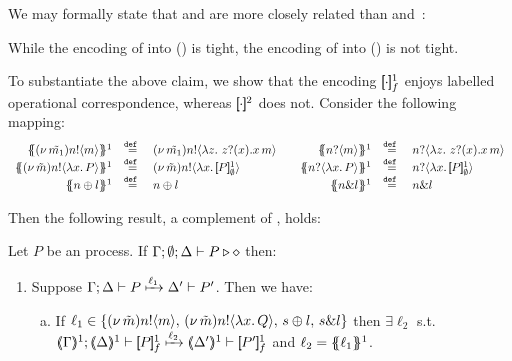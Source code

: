 \documentclass[runningheads]{llncs}
\begin{document}
{{We may formally state that 
\HOp and \HO are more closely related than \HOp and~\sessp:
\begin{theorem}\label{t:tight}
While the encoding of \HOp into \HO () is tight, the encoding of \HOp into \sessp () is not tight.
\end{theorem}

To substantiate the above claim, we show that the encoding $[\!\![\cdot]\!\!]^1_f$ enjoys 
labelled operational correspondence, whereas $[\!\![\cdot]\!\!]^2$ does not. 
Consider the following mapping:
\[
	\begin{array}{rclcrcl}
		\mapa{\news{\tilde{m_1}}\bactout{n}{m}}^{1}	&\defeq&	\news{\tilde{m_1}}\bactout{n}{\abs{z}{\,\binp{z}{x} \appl{x}{m}} }
		& &
		\mapa{\bactinp{n}{m}}^{1}			&\defeq&	\bactinp{n}{\abs{z}{\,\binp{z}{x} \appl{x}{m}} }
		\\
		\mapa{\news{\tilde{m}}\bactout{n}{\abs{x}{P}}}^{1} &\defeq& \news{\tilde{m}}\bactout{n}{\abs{x}{\pmapp{P}{1}{\es}}}
		& &
		\mapa{\bactinp{n}{\abs{x}{P}}}^{1} &\defeq& \bactinp{n}{\abs{x}{\pmapp{P}{1}{\es}}}
		\\
		\mapa{\bactsel{n}{l} }^{1} &\defeq& \bactsel{n}{l} 
		& &
		\mapa{\bactbra{n}{l} }^{1} &\defeq& \bactbra{n}{l} 
	\end{array}
\]



Then the following result, a complement of , holds:

\begin{proposition}
	\label{prop:lts_corr_HOp_to_HO}
	Let $P$ be an \HOp process.
	If $\Gamma; \emptyset; \Delta \vdash P \triangleright \diamond$ then:
%
	\begin{enumerate}[1.]
		\item
			Suppose $\Gamma; \Delta \vdash P \xmapsto{\ell_1} \Delta' \vdash P'$. Then we have:
%
			\begin{enumerate}[a)]
				\item
					If $\ell_1 \in \{(\nu\, \tilde{m})n ! \langle m \rangle, \,(\nu\, \tilde{m})n ! \langle \lambda x.\,Q \rangle, \,s \oplus l, \,s \& l\}$
					then $\exists \ell_2$ s.t. \\
					$\horel{\tmap{\Gamma}{1}}{\tmap{\Delta}{1}}{\pmapp{P}{1}{f}}{\hby{\ell_2}}{\tmap{\Delta'}{1}}{\pmapp{P'}{1}{f}}$
					and $\ell_2 = \{\!\!\{\ell_1\}\!\!\}^{1}$.
			

\end{enumerate}
\end{enumerate}
\end{proposition}}}
\end{document}
